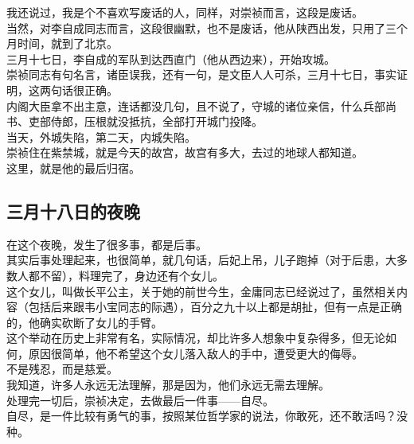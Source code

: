 \begin{multicols}{\theparacolNo}
我还说过，我是个不喜欢写废话的人，同样，对崇祯而言，这段是废话。\\

当然，对李自成同志而言，这段很幽默，也不是废话，他从陕西出发，只用了三个月时间，就到了北京。\\

三月十七日，李自成的军队到达西直门（他从西边来），开始攻城。\\

崇祯同志有句名言，诸臣误我，还有一句，是文臣人人可杀，三月十七日，事实证明，这两句话很正确。\\

内阁大臣拿不出主意，连话都没几句，且不说了，守城的诸位亲信，什么兵部尚书、吏部侍郎，压根就没抵抗，全部打开城门投降。\\

当天，外城失陷，第二天，内城失陷。\\

崇祯住在紫禁城，就是今天的故宫，故宫有多大，去过的地球人都知道。\\

这里，就是他的最后归宿。\\

\subsection{三月十八日的夜晚}
在这个夜晚，发生了很多事，都是后事。\\

其实后事处理起来，也很简单，就几句话，后妃上吊，儿子跑掉（对于后患，大多数人都不留），料理完了，身边还有个女儿。\\

这个女儿，叫做长平公主，关于她的前世今生，金庸同志已经说过了，虽然相关内容（包括后来跟韦小宝同志的际遇），百分之九十以上都是胡扯，但有一点是正确的，他确实砍断了女儿的手臂。\\

这个举动在历史上非常有名，实际情况，却比许多人想象中复杂得多，但无论如何，原因很简单，他不希望这个女儿落入敌人的手中，遭受更大的侮辱。\\

不是残忍，而是慈爱。\\

我知道，许多人永远无法理解，那是因为，他们永远无需去理解。\\

处理完一切后，崇祯决定，去做最后一件事——自尽。\\

自尽，是一件比较有勇气的事，按照某位哲学家的说法，你敢死，还不敢活吗？没种。\\


\end{multicols}
